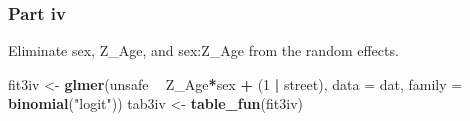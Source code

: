 \documentclass[]{article}
\newenvironment{Shaded}{\begin{snugshade}}{\end{snugshade}}
\newcommand{\KeywordTok}[1]{\textcolor[rgb]{0.13,0.29,0.53}{\textbf{#1}}}
\newcommand{\DataTypeTok}[1]{\textcolor[rgb]{0.13,0.29,0.53}{#1}}
\newcommand{\DecValTok}[1]{\textcolor[rgb]{0.00,0.00,0.81}{#1}}
\newcommand{\StringTok}[1]{\textcolor[rgb]{0.31,0.60,0.02}{#1}}
\newcommand{\OperatorTok}[1]{\textcolor[rgb]{0.81,0.36,0.00}{\textbf{#1}}}
\newcommand{\NormalTok}[1]{#1}
\begin{document}
\subsubsection{Part iv}\label{part-iv-1}

Eliminate sex, Z\_Age, and sex:Z\_Age from the random effects.

\begin{Shaded}
\begin{Highlighting}[]
\NormalTok{fit3iv <-}\StringTok{ }\KeywordTok{glmer}\NormalTok{(unsafe }\OperatorTok{~}\StringTok{ }\NormalTok{Z_Age}\OperatorTok{*}\NormalTok{sex }\OperatorTok{+}\StringTok{ }\NormalTok{(}\DecValTok{1} \OperatorTok{|}\StringTok{ }\NormalTok{street), }
                \DataTypeTok{data =}\NormalTok{ dat, }\DataTypeTok{family =} \KeywordTok{binomial}\NormalTok{(}\StringTok{"logit"}\NormalTok{))}
\NormalTok{tab3iv <-}\StringTok{ }\KeywordTok{table_fun}\NormalTok{(fit3iv)}
\end{Highlighting}
\end{Shaded}
\end{document}
